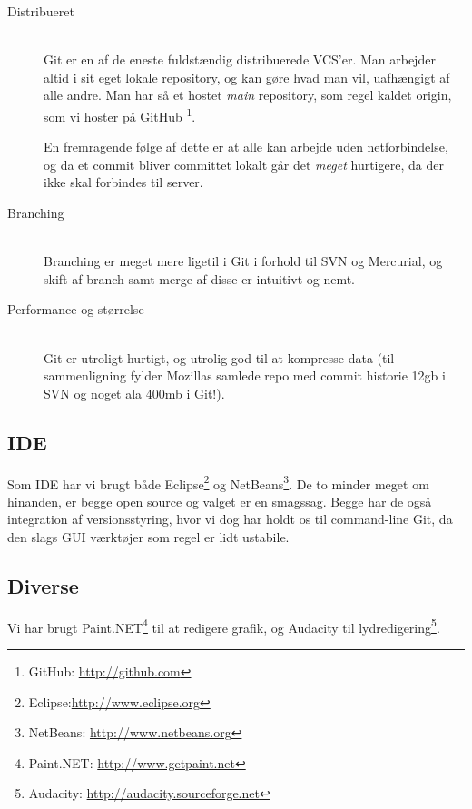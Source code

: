 \documentclass[titlepage,danish]{article}
\begin{document}
\begin{description}
  \item[Distribueret] \hfill \\
    Git er en af de eneste fuldstændig distribuerede VCS'er. Man arbejder altid i sit eget lokale
    repository, og kan gøre hvad man vil, uafhængigt af alle andre. Man har så et hostet
    \emph{main} repository, som regel kaldet origin, som vi hoster på GitHub \footnote{GitHub:
      \url{http://github.com}}. 

    En fremragende følge af dette er at alle kan arbejde uden netforbindelse, og da et commit bliver
    committet lokalt går det \emph{meget} hurtigere, da der ikke skal forbindes til server.

  \item[Branching] \hfill \\
    Branching er meget mere ligetil i Git i forhold til SVN og Mercurial, og skift af branch samt
    merge af disse er intuitivt og nemt.

  \item[Performance og størrelse] \hfill \\
    Git er utroligt hurtigt, og utrolig god til at kompresse data (til sammenligning fylder Mozillas
    samlede repo med commit historie 12gb i SVN og noget ala 400mb i Git!).
\end{description}

\subsection{IDE}
Som IDE har vi brugt både Eclipse\footnote{Eclipse:\url{http://www.eclipse.org}} og
NetBeans\footnote{NetBeans: \url{http://www.netbeans.org}}. De to minder meget om hinanden, er begge
open source og valget er en smagssag. Begge har de også integration af versionsstyring, hvor vi dog
har holdt os til command-line Git, da den slags GUI værktøjer som regel er lidt ustabile.

\subsection{Diverse}
Vi har brugt Paint.NET\footnote{Paint.NET: \url{http://www.getpaint.net}} til at redigere grafik, og
Audacity til lydredigering\footnote{Audacity: \url{http://audacity.sourceforge.net}}.
\end{document}
